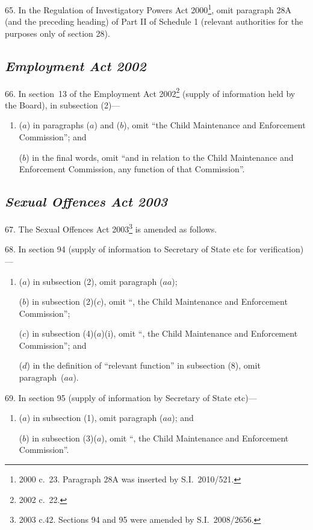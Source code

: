 \documentclass[12pt,a4paper]{article}
\begin{document}
65.  In the Regulation of Investigatory Powers Act 2000\footnote{2000 c.~23. Paragraph 28A was inserted by S.I.~2010/521.}, omit paragraph 28A (and the preceding heading) of Part II of Schedule 1 (relevant authorities for the purposes only of section 28).

\subsection*{\itshape Employment Act 2002}

66.  In section~13 of the Employment Act 2002\footnote{2002 c.~22.} (supply of information held by the Board), in subsection (2)—
\begin{enumerate}\item[]
($a$) in paragraphs ($a$)  and ($b$), omit “the Child Maintenance and Enforcement Commission”; and

($b$) in the final words, omit “and in relation to the Child Maintenance and Enforcement Commission, any function of that Commission”.
\end{enumerate}

\subsection*{\itshape Sexual Offences Act 2003}

67.  The Sexual Offences Act 2003\footnote{2003 c.42. Sections 94 and 95 were amended by S.I.~2008/2656.} is amended as follows.

\medskip

68.  In section 94 (supply of information to Secretary of State etc for verification)—
\begin{enumerate}\item[]
($a$) in subsection (2), omit paragraph ($aa$);

($b$) in subsection (2)($c$), omit “, the Child Maintenance and Enforcement Commission”;

($c$) in subsection (4)($a$)(i), omit “, the Child Maintenance and Enforcement Commission”; and

($d$) in the definition of “relevant function” in subsection (8), omit paragraph~($aa$).
\end{enumerate}

\medskip

69.  In section 95 (supply of information by Secretary of State etc)—
\begin{enumerate}\item[]
($a$) in subsection (1), omit paragraph ($aa$); and

($b$) in subsection (3)($a$), omit “, the Child Maintenance and Enforcement Commission”.
\end{enumerate}
\end{document}

